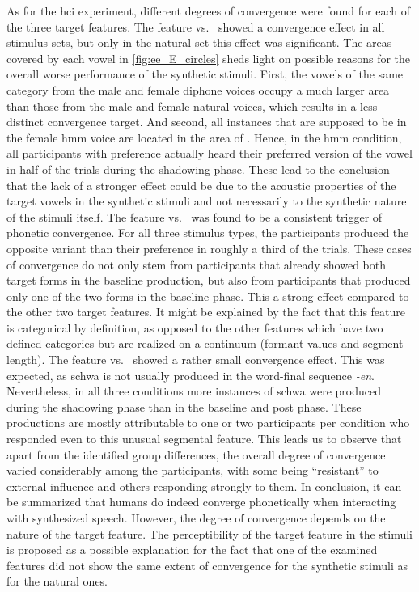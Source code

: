 As for the \ac{hci} experiment, different degrees of convergence were found for each of the three target features.
The feature \textipa{[E:]} vs.\ \textipa{[e:]} showed a convergence effect in all stimulus sets, but only in the natural set this effect was significant.
The areas covered by each vowel in \cref{fig:ee_E_circles} sheds light on possible reasons for the overall worse performance of the synthetic stimuli.
First, the vowels of the same category from the male and female diphone voices occupy a much larger area than those from the male and female natural voices, which results in a less distinct convergence target.
And second, all instances that are supposed to be \textipa{[E:]} in the female \ac{hmm} voice are located in the area of \textipa{[e:]}.
Hence, in the \ac{hmm} condition, all participants with preference \textipa{[e:]} actually heard their preferred version of the vowel in half of the trials during the shadowing phase.
These lead to the conclusion that the lack of a stronger effect could be due to the acoustic properties of the target vowels in the synthetic stimuli and not necessarily to the synthetic nature of the stimuli itself.
The feature \textipa{[I\c{c}]} vs.\ \textipa{[Ik]} was found to be a consistent trigger of phonetic convergence.
For all three stimulus types, the participants produced the opposite variant than their preference in roughly a third of the trials.
These cases of convergence do not only stem from participants that already showed both target forms in the baseline production, but also from participants that produced only one of the two forms in the baseline phase.
This a strong effect compared to the other two target features.
It might be explained by the fact that this feature is categorical by definition, as opposed to the other features which have two defined categories but are realized on a continuum (formant values and segment length).
The feature \textipa{[\s{n}]} vs.\ \textipa{[@n]} showed a rather small convergence effect.
This was expected, as schwa is not usually produced in the word-final sequence \textit{-en}.
Nevertheless, in all three conditions more instances of schwa were produced during the shadowing phase than in the baseline and post phase.
These productions are mostly attributable to one or two participants per condition who responded even to this unusual segmental feature.
This leads us to observe that apart from the identified group differences, the overall degree of convergence varied considerably among the participants, with some being \enquote{resistant} to external influence and others responding strongly to them.
In conclusion, it can be summarized that humans do indeed converge phonetically when interacting with synthesized speech. 
However, the degree of convergence depends on the nature of the target feature. 
The perceptibility of the target feature in the stimuli is proposed as a possible explanation for the fact that one of the examined features did not show the same extent of convergence for the synthetic stimuli as for the natural ones.

